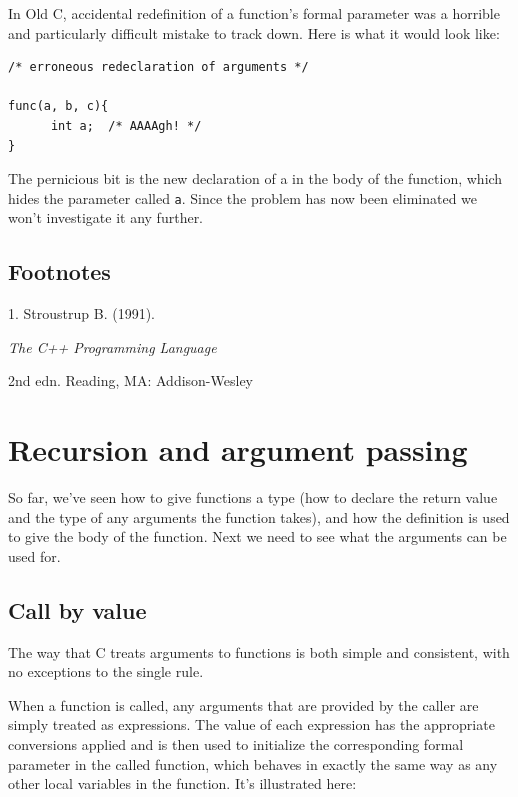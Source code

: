    In Old C, accidental redefinition of a function's formal parameter was
    a horrible and particularly difficult mistake to track down. Here is
    what it would look like:

\begin{Verbatim}
/* erroneous redeclaration of arguments */

func(a, b, c){
      int a;  /* AAAAgh! */
}
\end{Verbatim}

   The pernicious bit is the new declaration of a in the body of the
    function, which hides the parameter called \texttt{a}. Since the
    problem has now been eliminated we won't investigate it any further.


  
 \subsection{Footnotes}1. Stroustrup
     B. (1991). \begin{center}\textit{The C++ Programming Language}\end{center}

 2nd edn.
     Reading, MA: Addison-Wesley


        \section{Recursion and argument passing}
        

  

  So far, we've seen how to give functions a type (how to declare the
   return value and the type of any arguments the function takes), and how
   the definition is used to give the body of the function. Next we need to
   see what the arguments can be used for.


  \subsection{Call by value}
   

   The way that C treats arguments to functions is both simple and
    consistent, with no exceptions to the single rule.


   When a function is called, any arguments that are provided by the
    caller are simply treated as expressions. The value of each expression
    has the appropriate conversions applied and is then used to initialize
    the corresponding formal parameter in the called function, which behaves
    in exactly the same way as any other local variables in the function.
    It's illustrated here:

